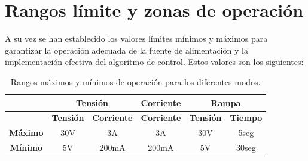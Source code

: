 \section{Rangos límite y zonas de operación}
A su vez se han establecido los valores límites mínimos y máximos para garantizar la operación adecuada de la fuente de alimentación y la implementación efectiva del algoritmo de control. Estos valores son los siguientes:

\begin{table}[h!]
\centering
\begin{tabular}{|c|c|c|c|c|c|}
\hline
       & \multicolumn{2}{c|}{\textbf{Tensión}} & \multicolumn{1}{c|}{\textbf{Corriente}} & \multicolumn{2}{c|}{\textbf{Rampa}} \\ \hline
       & \textbf{Tensión}  & \textbf{Corriente} & \textbf{Corriente} & \textbf{Tensión} & \textbf{Tiempo} \\ \hline
\textbf{Máximo} &30V            &3A             &3A                &30V             &5seg               \\ \hline
\textbf{Mínimo} &5V             &200mA          &200mA             &5V              &30seg               \\ \hline
\end{tabular}
\caption{Rangos máximos y mínimos de operación para los diferentes modos.}
\end{table}











